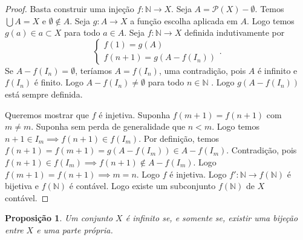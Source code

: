 \documentclass{article}
\newtheorem{prop}{Proposição}[section]
\theoremstyle{theorem}
\theoremstyle{lemma}
\theoremstyle{definition}
\theoremstyle{remark}
\begin{document}
\begin{proof}
	Basta construir uma injeção $f: \mathbb{N} \to X$. Seja $A = \mathcal{P}(X) - \emptyset$. Temos $\bigcup A = X$ e $\emptyset \not \in A$. Seja $g: A \to X$ a função escolha aplicada em $A$. Logo temos $g(a) \in a \subset X$ para todo $a\in A$. Seja $f: \mathbb{N} \to X$ definida indutivamente por $$ \begin{cases} f(1) = g(A) \\ f(n+1) = g(A -f(I_n) ) \end{cases} .$$  Se $A - f(I_n) = \emptyset$, teríamos $A = f(I_n)$, uma contradição, pois $A$ é infinito e $f(I_n)$ é finito. Logo $A - f(I_n) \neq \emptyset$ para todo $n \in \mathbb{N}$ .  Logo $g(A - f(I_n))$ está sempre definida.

		Queremos mostrar que $f$ é injetiva. Suponha $f(m+1) = f(n+1)$ com $m\neq m$. Suponha sem perda de generalidade que $n<m$. Logo temos $n+1\in I_m \implies f(n+1) \in f(I_m)$. Por definição, temos $ f(n+1) = f(m+1) =  g(A - f(I_m)) \in A - f(I_m)$. Contradição, pois $f(n+1) \in f(I_m) \implies f(n+1)\not \in A - f(I_m)$. Logo $f(m+1) = f(n+1) \implies m = n$. Logo $f$ é injetiva.
		Logo $f': \mathbb{N} \to f(\mathbb{N} )$ é bijetiva  e $f(\mathbb{N})$ é contável. Logo existe um subconjunto $f\left(\mathbb{N}\right)$ de $X$ contável.
\end{proof}
\begin{prop}
	Um conjunto $X$ é infinito se, e somente se, existir uma bijeção entre $X$ e uma parte própria.
\end{prop}
\end{document}
